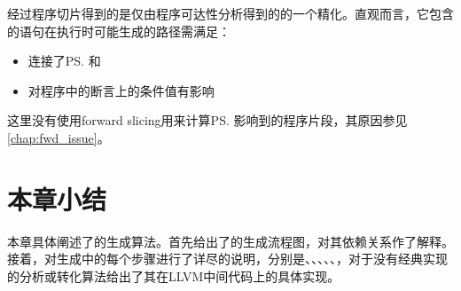 经过程序切片得到的\rbscope 是仅由程序可达性分析得到的\rbscope 的一个精化。直观而言，它包含的语句在执行时可能生成的路径需满足：
\begin{itemize}
\item 连接了\prog\ps 和\prog\bs
\item 对程序中的断言\prog\ass 上的条件值有影响
\end{itemize}

这里没有使用forward slicing用来计算\prog\ps 影响到的程序片段，其原因参见\autoref{chap:fwd_issue}。

\section{本章小结}
\label{sec:c3}

本章具体阐述了\rbscope 的生成算法。首先给出了\rbscope 的生成流程图，对其依赖关系作了解释。接着，对\rbscope 生成中的每个步骤进行了详尽的说明，分别是、、、、、，对于没有经典实现的分析或转化算法给出了其在LLVM中间代码上的具体实现。